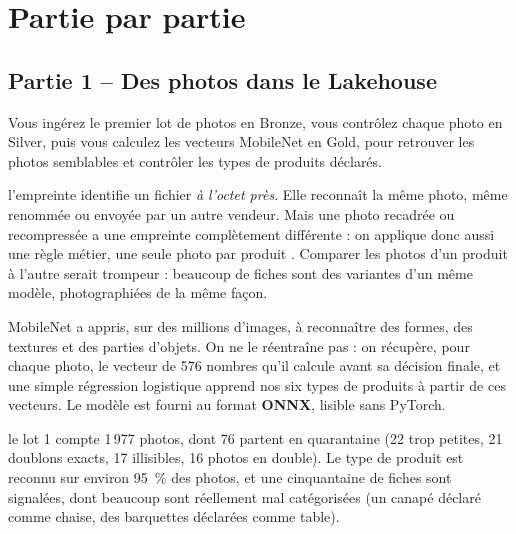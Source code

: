 \section{Partie par partie}

\subsection*{Partie 1 -- Des photos dans le Lakehouse \hfill {}}

Vous ingérez le premier lot de photos en Bronze, vous contrôlez chaque photo en Silver, puis vous
calculez les vecteurs MobileNet en Gold, pour retrouver les photos semblables et contrôler les
types de produits déclarés.

\begin{notion}
l'empreinte  identifie un fichier \emph{à l'octet
près}. Elle reconnaît la même photo, même renommée ou envoyée par un autre vendeur. Mais une photo
recadrée ou recompressée a une empreinte complètement différente : on applique donc aussi une règle
métier, \og une seule photo par produit \fg{}. Comparer les photos d'un produit à l'autre serait
trompeur : beaucoup de fiches sont des variantes d'un même modèle, photographiées de la même façon.
\end{notion}

\begin{notion}
MobileNet a appris, sur des millions d'images, à reconnaître
des formes, des textures et des parties d'objets. On ne le réentraîne pas : on récupère, pour chaque
photo, le vecteur de 576 nombres qu'il calcule avant sa décision finale, et une simple régression
logistique apprend nos six types de produits à partir de ces vecteurs. Le modèle est fourni au
format \textbf{ONNX}, lisible sans PyTorch.
\end{notion}

\begin{resultat}
le lot 1 compte 1\,977 photos, dont 76 partent en quarantaine (22 trop petites, 21 doublons exacts,
17 illisibles, 16 photos en double). Le type de produit est reconnu sur environ 95~\% des photos, et
une cinquantaine de fiches sont signalées, dont beaucoup sont réellement mal catégorisées (un canapé
déclaré comme chaise, des barquettes déclarées comme table).
\end{resultat}

